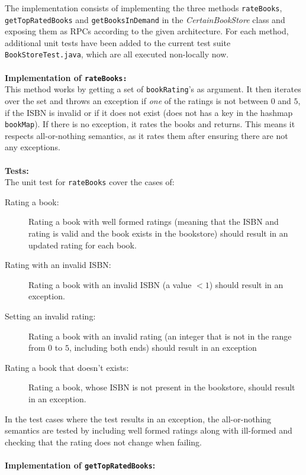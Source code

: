 \documentclass[a4paper]{article}
\begin{document}
\subsubsection{}
The implementation consists of implementing the three methods \texttt{rateBooks}, \texttt{getTopRatedBooks} and \texttt{getBooksInDemand} in the \textit{CertainBookStore} class and exposing them as RPCs according to the given architecture. For each method, additional unit tests have been added to the current test suite \texttt{BookStoreTest.java}, which are all executed non-locally now.\\
\\
\textbf{Implementation of \texttt{rateBooks:}} \\
This method works by getting a set of \texttt{bookRating}'s as argument. It then iterates over the set and throws an exception if \textit{one} of the ratings is not between $0$ and $5$, if the ISBN is invalid or if it does not exist (does not has a key in the hashmap \texttt{bookMap}). If there is no exception, it rates the books and returns. This means it respects all-or-nothing semantics, as it rates them after ensuring there are not any exceptions. \\
\\
\textbf{Tests:}\\
The unit test for \texttt{rateBooks} cover the cases of:
\begin{description}
  \item[Rating a book:] Rating a book with well formed ratings (meaning that the ISBN and rating is valid and the book exists in the bookstore) should result in an updated rating for each book.
  \item[Rating with an invalid ISBN:] Rating a book with an invalid ISBN (a value $<1$) should result in an exception.
  \item[Setting an invalid rating:] Rating a book with an invalid rating (an integer that is not in the range from $0$ to $5$, including both ends) should result in an exception
  \item[Rating a book that doesn't exists:] Rating a book, whose ISBN is not present in the bookstore, should result in an exception.
\end{description}
In the test cases where the test results in an exception, the all-or-nothing semantics are tested by including well formed ratings along with ill-formed and checking that the rating does not change when failing.\\
\\
\textbf{Implementation of \texttt{getTopRatedBooks}:} \\
\end{document}
